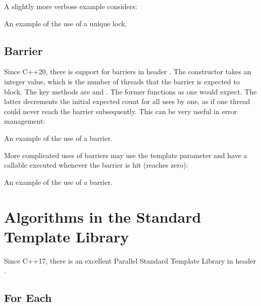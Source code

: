 \begin{itemize}
\begin{end}
A slightly more verbose example considers:

\raggedbottom
\begin{codebox}[]{\href{https://godbolt.org/z/qeYzaz6We}{\ExternalLink}}
\footnotesize An example of the use of a unique lock.
\tcblower
{}
\end{codebox}

\subsection{Barrier}

Since C++20, there is support for barriers in header . The constructor takes an integer value, which is the number of threads that the barrier is expected to block. The key methods are  and . The former functions as one would expect. The latter decrements the initial expected count for all uses by one, as if one thread could never reach the barrier subsequently. This can be very useful in error management:

\raggedbottom
\begin{codebox}[]{\href{https://godbolt.org/z/fT17E5P4x}{\ExternalLink}}
\footnotesize An example of the use of a barrier.
\tcblower
{}
\end{codebox}

More complicated uses of barriers may use the template parameter  and have a callable executed whenever the barrier is hit (reaches zero):

\raggedbottom
\begin{codebox}[]{\href{https://godbolt.org/z/McM63hnn4}{\ExternalLink}}
\footnotesize An example of the use of a barrier.
\tcblower
{}
\end{codebox}

\section{Algorithms in the Standard Template Library}

Since C++17, there is an excellent Parallel Standard Template Library in header .

\subsection{For Each}
\label{sec:foreachcpp23}


\end{end}
\end{itemize}
